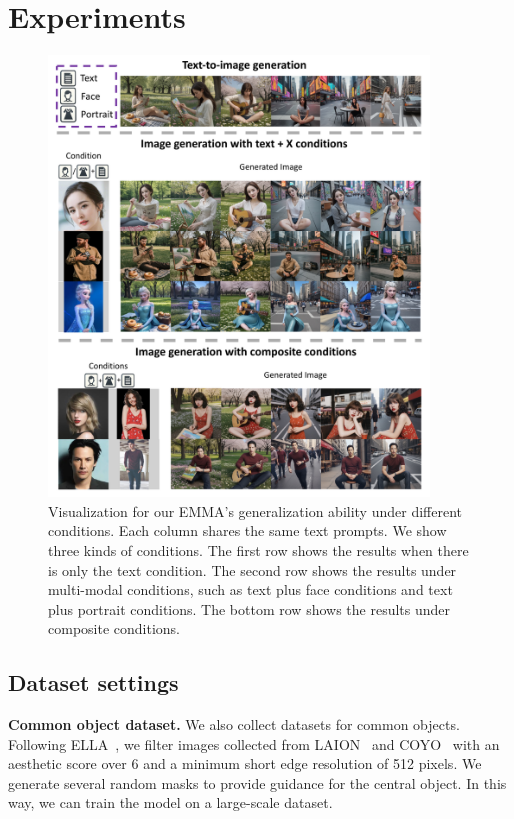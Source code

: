 

\section{Experiments}\label{sec:exp}
\begin{figure}[t]
    \centering
    \includegraphics[width=0.9\textwidth]{images/final_visualization.pdf}
    \caption{Visualization for our EMMA's generalization ability under different conditions. Each column shares the same text prompts. We show three kinds of conditions. The first row shows the results when there is only the text condition. The second row shows the results under multi-modal conditions, such as text plus face conditions and text plus portrait conditions. The bottom row shows the results under composite conditions.}
    \label{fig:final_visualization}
\end{figure}

\subsection{Dataset settings}
\textbf{Common object dataset.} We also collect datasets for common objects. Following ELLA~\cite{hu2024ella}, we filter images collected from LAION~\cite{schuhmann2022laion} and COYO~\cite{kakaobrain2022coyo-700m} with an aesthetic score over 6 and a minimum short edge resolution of 512 pixels. We generate several random masks to provide guidance for the central object. In this way, we can train the model on a large-scale dataset. 

